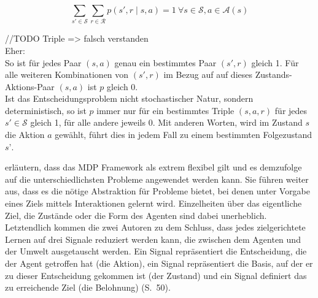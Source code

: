 \begin{equation}\label{eq:wahrscheinlichkeitsverteilung}
\sum_{s' \in \mathcal{S}} \sum_{r \in \mathcal{R}} p(s', r \mid s,a) = 1 \ \forall s \in \mathcal{S}, a \in \mathcal{A}(s)
\end{equation}

//TODO Triple => falsch verstanden \\
Eher: \\
So ist für jedes Paar $(s,a)$ genau ein bestimmtes Paar $(s',r)$ gleich 1. Für alle weiteren Kombinationen von $(s',r)$ im Bezug auf auf dieses Zustands-Aktions-Paar $(s,a)$ ist $p$ gleich 0. \\
Ist das Entscheidungsproblem nicht stochastischer Natur, sondern deterministisch, so ist $p$ immer nur für ein bestimmtes Triple $(s,a,r)$ für jedes $s' \in \mathcal{S}$ gleich 1, für alle andere jeweils 0. Mit anderen Worten, wird im Zustand $s$ die Aktion $a$ gewählt, führt dies in jedem Fall zu einem bestimmten Folgezustand $s’$. 
\par 

\cite{Sutton1998} erläutern, dass das MDP Framework als extrem flexibel gilt und es demzufolge auf die unterschiedlichsten Probleme angewendet werden kann. Sie führen weiter aus, dass es die nötige Abstraktion für Probleme bietet, bei denen unter Vorgabe eines Ziels mittels Interaktionen gelernt wird. Einzelheiten über das eigentliche Ziel, die Zustände oder die Form des Agenten sind dabei unerheblich. 
Letztendlich kommen die zwei Autoren zu dem Schluss, dass \glqq jedes zielgerichtete Lernen auf drei Signale reduziert werden kann, die zwischen dem Agenten und der Umwelt ausgetauscht werden. Ein Signal repräsentiert die Entscheidung, die der Agent getroffen hat (die Aktion), ein Signal repräsentiert die Basis, auf der er zu dieser Entscheidung gekommen ist (der Zustand) und ein Signal definiert das zu erreichende Ziel (die Belohnung)\grqq{} (S.~50).

